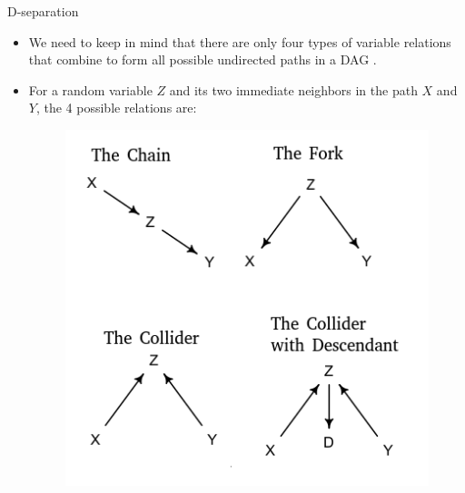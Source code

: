 \documentclass[handout]{beamer}
\begin{document}
\begin{frame}{D-separation}
\scriptsize{
\begin{itemize}

\item We need to keep in mind that there are only four types of variable relations that combine to form all possible undirected paths in a DAG \cite{mcelreath2020statistical}.

\item For a random variable $Z$ and its two immediate neighbors in the path $X$ and $Y$, the 4 possible relations are:

  \begin{figure}[h!]
	\centering
	\includegraphics[scale=0.61]{pics/collider.png}
	\end{figure} 


 
 
\end{itemize}



} 

\end{frame}
\end{document}
